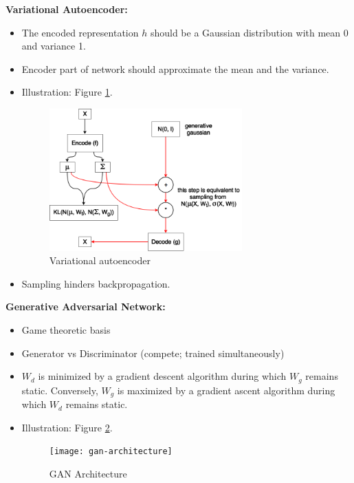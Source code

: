 \documentclass[parskip=half]{scrartcl}
\begin{document}
    \textbf{Variational Autoencoder:}
    \begin{itemize}
        \item 
        The encoded representation $h$ should be a Gaussian distribution with mean 0 and variance 1.
        \item 
        Encoder part of network should approximate the mean and the variance.
        \item 
        Illustration: Figure \ref{fig:variation-autoencoder}.
        \begin{figure}[ht]
            \centering
            \includegraphics[width=0.7\textwidth]{variation-autoencoder}
            \caption{Variational autoencoder}
            \label{fig:variation-autoencoder}
        \end{figure}
        \item 
        Sampling hinders backpropagation.
    \end{itemize}

    \textbf{Generative Adversarial Network:}
    \begin{itemize}
        \item 
        Game theoretic basis
        \item 
        Generator vs Discriminator (compete; trained simultaneously)
        \item 
        $W_d$ is minimized by a gradient descent algorithm during which $W_g$ remains static.
        Conversely, $W_g$ is maximized by a gradient ascent algorithm during which $W_d$ remains static.
        \item 
        Illustration: Figure \ref{fig:gan-architecture}.
        \begin{figure}[ht]
            \centering
            \texttt{[image: gan-architecture]}
            \caption{GAN Architecture}
            \label{fig:gan-architecture}
        \end{figure}
    \end{itemize}
\end{document}
